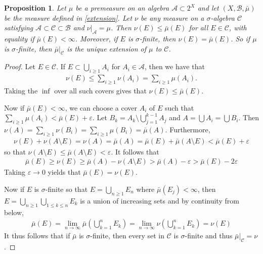 \documentclass[11pt]{amsart}
\newtheorem{proposition}[theorem]{Proposition}
\theoremstyle{definition}
\numberwithin{equation}{section}
\begin{document}
\begin{proposition}
    Let $\mu$ be a premeasure on an algebra $\mathcal A\subset 2^X$ and let $(X,\mathcal B,\bar\mu)$ be the measure defined in \ref{extension}. Let $\nu$ be any measure on a $\sigma$-algebra $\mathcal C$ satisfying $\mathcal A\subset\mathcal C\subset\mathcal B$ and $\nu|_\mathcal A=\mu$. Then $\nu(E)\le\bar\mu(E)$ for all $E\in\mathcal C$, with equality if $\bar\mu(E)<\infty$. Moreover, if $E$ is $\sigma$-finite, then $\nu(E)=\bar\mu(E)$. So if $\mu$ is $\sigma$-finite, then $\bar\mu|_\mathcal C$ is the unique extension of $\mu$ to $\mathcal C$.
\end{proposition}
\begin{proof}
    Let $E\in\mathcal C$. If $E\subset\bigcup_{i\ge 1}A_i$ for $A_i\in\mathcal A$, then we have that
    \begin{align*}
        \nu(E)\le\sum_{i\ge 1}\nu(A_i)=\sum_{i\ge 1}\mu(A_i).
    \end{align*}
    Taking the $\inf$ over all such covers gives that $\nu(E)\le\bar\mu(E)$.

    Now if $\bar\mu(E)<\infty$, we can choose a cover $A_i$ of $E$ such that $\sum_{i\ge 1}\mu(A_i)<\bar\mu(E)+\varepsilon$. Let $B_k=A_k\setminus\bigcup_{j=1}^{k-1}A_j$ and $A=\bigcup A_i=\bigcup B_i$. Then $\nu(A)=\sum_{i\ge 1}\nu(B_i)=\sum_{i\ge 1}\mu(B_i)=\bar\mu(A)$. Furthermore,
    \begin{align*}
        \nu(E)+\nu(A\setminus E)=\nu(A)=\bar\mu(A)=\bar\mu(E)+\bar\mu(A\setminus E)<\bar\mu(E)+\varepsilon
    \end{align*}
    so that $\nu(A\setminus E)\le\bar\mu(A\setminus E)<\varepsilon$. It follows that 
    \begin{align*}
        \bar\mu(E)\ge\nu(E)\ge\bar\mu(A)-\nu(A\setminus E)>\bar\mu(A)-\varepsilon>\bar\mu(E)-2\varepsilon
    \end{align*}
    Taking $\varepsilon\to0$ yields that $\bar\mu(E)=\nu(E)$.

    Now if $E$ is $\sigma$-finite so that $E=\bigcup_{n\ge 1}E_n$ where $\bar\mu(E_j)<\infty$, then $E=\bigcup_{n\ge 1}\bigcup_{1\le k\le n}E_k$ is a union of increasing sets and by continuity from below,
    \begin{align*}
        \bar\mu(E)=\lim_{n\to\infty}\bar\mu(\bigcup_{k=1}^nE_k)=\lim_{n\to\infty}\nu(\bigcup_{k=1}^nE_k)=\nu(E)
    \end{align*}
    It thus follows that if $\bar\mu$ is $\sigma$-finite, then every set in $\mathcal C$ is $\sigma$-finite and thus $\bar\mu|_\mathcal C=\nu$.
\end{proof}
\end{document}
